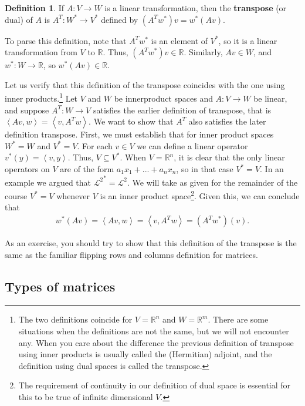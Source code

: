 \documentclass[12pt,reqno]{amsart}
\def\R{\mathbb{R}}
\newcommand{\iprod}[2]{\left\langle {#1} , {#2} \right\rangle}
\theoremstyle{definition}
\newtheorem{definition}{Definition}[section]
\begin{document}
\begin{definition}
  If $A: V \to W$ is a linear transformation, then the
  \textbf{transpose} (or dual) of $A$ is $A^T: W^\ast \to V^\ast$
  defined by $(A^Tw^\ast)v = w^\ast(Av)$.
\end{definition}
To parse this definition, note that $A^T w^\ast$ is an element of
$V^\ast$, so it is a linear transformation from $V$ to $\R$. Thus,
$(A^T w^\ast) v \in \R$. Similarly, $Av \in W$, and $w^\ast: W \to
\R$, so $w^\ast (A v) \in \R$. 

Let us verify that this definition of the transpose coincides with the
one using inner products.\footnote{The two definitions coincide for
  $V=\R^n$ and $W = \R^m$. There are some situations when the
  definitions are not the same, but we will not encounter any. When
  you care about the difference the previous definition of transpose
  using inner products is usually called the (Hermitian) adjoint, and
  the definition using dual spaces is called the transpose.} Let $V$
and $W$ be innerproduct spaces and $A: V \to W$ be linear, and suppose
$A^T: W \to V$ satisfies the earlier definition of transpose, that is
$\iprod{A v}{w} = \iprod{v}{A^T w}$. We want to show that $A^T$ also
satisfies the later definition transpose. First, we must establish
that for inner product spaces $W^\ast = W$ and $V^\ast = V$. For each
$v \in V$ we can define a linear operator $v^\ast( y) =
\iprod{v}{y}$. Thus, $V \subseteq V^\ast$. When $V = \R^n$, it is
clear that the only linear operators on $V$ are of the form $a_1 x_1 +
... + a_n x_n$, so in that case $V^\ast = V$. In an example we argued
that ${\mathcal{L}^2}^\ast = \mathcal{L}^2$. We will take as given for
the remainder of the course $V^\ast = V$ whenever $V$ is an inner
product space\footnote{The requirement of continuity in our definition
  of dual space is essential for this to be true of infinite
  dimensional $V$.}. Given this, we can conclude that
\begin{align*}
  w^\ast (A v) = \iprod{A v}{w} =  \iprod{v}{A^T w} = (A^T w^\ast) (v).
\end{align*}

As an exercise, you should try to show that this definition of the
transpose is the same as the familiar flipping rows and columns
definition for matrices.


\subsection{Types of matrices}
\end{document}
